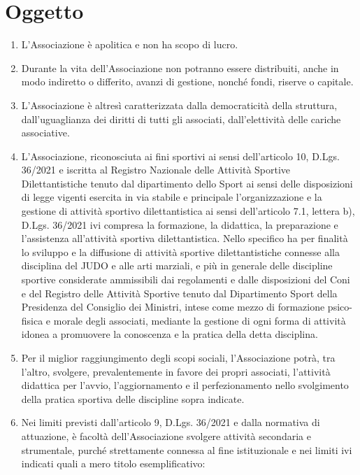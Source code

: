 \documentclass{djtsasddoc}
\begin{document}
	\section{Oggetto}
	\begin{enumerate}
		\item L'Associazione è apolitica e non ha scopo di lucro.
		\item Durante la vita dell'Associazione non potranno essere distribuiti, anche in modo indiretto o differito, avanzi di gestione, nonché fondi, riserve o capitale.
		\item L'Associazione è altresì caratterizzata dalla democraticità della struttura, dall'uguaglianza dei diritti di tutti gli associati, dall'elettività delle cariche associative.
		\item L'Associazione, riconosciuta ai fini sportivi ai sensi dell'articolo 10, D.Lgs. 36/2021 e iscritta al Registro Nazionale delle Attività Sportive Dilettantistiche  tenuto dal dipartimento dello Sport ai sensi delle disposizioni di legge vigenti esercita in via stabile e principale l'organizzazione e la gestione di attività sportivo dilettantistica ai sensi dell'articolo 7.1, lettera b), D.Lgs. 36/2021 ivi compresa la formazione, la didattica, la preparazione e l'assistenza all'attività sportiva dilettantistica. Nello specifico ha per finalità lo sviluppo e la diffusione di attività sportive dilettantistiche connesse alla disciplina del JUDO  e alle arti marziali, e più in generale delle discipline sportive considerate ammissibili dai regolamenti e dalle disposizioni del Coni e del Registro delle Attività Sportive tenuto dal Dipartimento Sport della Presidenza del Consiglio dei Ministri, intese come mezzo di formazione psico-fisica e morale degli associati, mediante la gestione di ogni forma di attività idonea a promuovere la conoscenza e la pratica della detta disciplina.
		\item Per il miglior raggiungimento degli scopi sociali, l'Associazione potrà, tra l'altro, svolgere, prevalentemente in favore dei propri associati, l'attività didattica per l'avvio, l'aggiornamento e il perfezionamento nello svolgimento della pratica sportiva delle discipline sopra indicate.
		\item Nei limiti previsti dall'articolo 9, D.Lgs. 36/2021 e dalla normativa di attuazione, è facoltà dell'Associazione svolgere attività secondaria e strumentale, purché strettamente connessa al fine istituzionale e nei limiti ivi indicati quali a mero titolo esemplificativo:
		\begin{itemize}

\end{itemize}
\end{enumerate}
\end{document}
